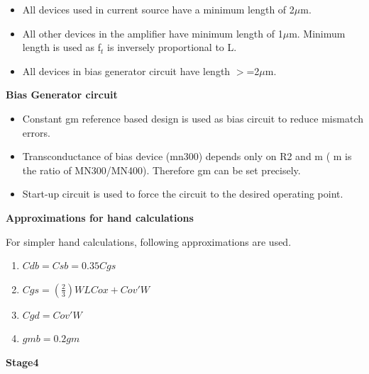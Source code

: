 \documentclass[12pt,a4paper]{article}
\begin{document}
\begin{itemize}
\item All devices used in current source have a minimum length of 2$\mu$m.
\item All other devices in the amplifier have minimum length of 1$\mu$m. 
Minimum length is used as f$_{t }$ is inversely proportional to L.
\item All devices in bias generator circuit have length $>$=2$\mu$m.
\end{itemize}


\textbf{Bias Generator circuit}

\begin{itemize}
\item Constant gm reference based design is used as bias circuit to 
reduce mismatch errors.
\item Transconductance of bias device (mn300) depends only on R2 and m ( 
m is the ratio of MN300/MN400). Therefore gm can be set precisely.
\item Start-up circuit is used to force the circuit to the desired 
operating point.
\end{itemize}


\textbf{Approximations for hand calculations}

For simpler hand calculations, following approximations are used.

\begin{enumerate}
\item $Cdb=Csb=0.35 Cgs$
\item $Cgs=(\frac{2}{3})WLCox+Cov'W$
\item $Cgd=Cov'W$
\item $gmb=0.2gm$
\setcounter{numberedCntBB}{\theenumi}
\end{enumerate}


\textbf{Stage4}
\end{document}
